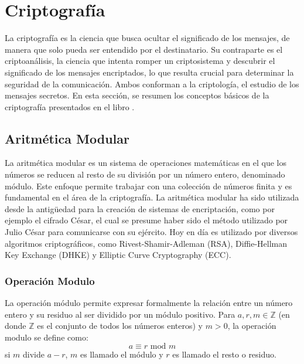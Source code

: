 \section{Criptografía}
La criptografía es la ciencia que busca ocultar el significado de los mensajes, de manera que solo pueda ser entendido por el destinatario. Su contraparte es el criptoanálisis, la ciencia que intenta romper un criptosistema y descubrir el significado de los mensajes encriptados, lo que resulta crucial para determinar la seguridad de la comunicación. Ambos conforman a la criptología, el estudio de los mensajes secretos. En esta sección, se resumen los conceptos básicos de la criptografía presentados en el libro \cite{paar-2011}.

\subsection{Aritmética Modular}
La aritmética modular es un sistema de operaciones matemáticas en el que los números se reducen al resto de su división por un número entero, denominado módulo. Este enfoque permite trabajar con una colección de números finita y es fundamental en el área de la criptografía. La aritmética modular ha sido utilizada desde la antigüedad para la creación de sistemas de encriptación, como por ejemplo el cifrado César, el cual se presume haber sido el método utilizado por Julio César para comunicarse con su ejército. Hoy en día es utilizado por diversos algoritmos criptográficos, como Rivest-Shamir-Adleman (RSA), Diffie-Hellman Key Exchange (DHKE) y Elliptic Curve Cryptography (ECC).

\subsubsection{Operación Modulo}
La operación módulo permite expresar formalmente la relación entre un número entero y su residuo al ser dividido por un módulo positivo.
Para $a,r,m \in \mathbb{Z}$ (en donde $\mathbb{Z}$ es el conjunto de todos los números enteros) y $m>0$, la operación modulo se define como:  
$$a \equiv r \text{ mod } m$$
si $m$ divide $a-r$, $m$ es llamado el módulo y $r$ es llamado el resto o residuo.

